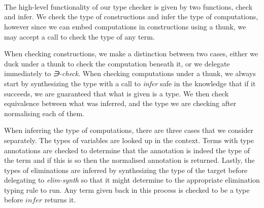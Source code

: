 {\begin{code}
\AgdaSymbol{\{}\AgdaSymbol{\}}\AgdaSpace{}%
\AgdaSymbol{(}\AgdaSpace{}%
\AgdaSpace{}%
\AgdaSymbol{)}\AgdaSpace{}%
\AgdaSymbol{(}\AgdaSpace{}%
\AgdaSpace{}%
\AgdaSymbol{)}\AgdaSpace{}%
\AgdaSymbol{=}%
\>[273I]\<%
\\
\>[273I][@{}l@{\AgdaIndent{0}}]%
\>[35]\AgdaSymbol{\AgdaUnderscore{}}\AgdaSpace{}%
\AgdaSpace{}%
\AgdaSpace{}%
\AgdaSpace{}%
\<%
\\
%
\>[35]\AgdaSpace{}%
\<%
\\
\>[0]\AgdaSpace{}%
\AgdaSpace{}%
%
\>[10]\AgdaSymbol{=}\AgdaSpace{}%
\AgdaSpace{}%
\AgdaSymbol{(}\AgdaSpace{}%
\AgdaOperator{\AgdaFunction{++}}\AgdaSpace{}%
\AgdaSpace{}%
\AgdaSpace{}%
\AgdaOperator{\AgdaFunction{++}}\AgdaSpace{}%
\AgdaSpace{}%
\AgdaOperator{\AgdaFunction{++}}\AgdaSpace{}%
\AgdaSpace{}%
\AgdaSymbol{)}\<%
\end{code}
}

The high-level functionality of our type checker is given by two functions,
check and infer. We check the type of constructions and infer the type of
computations, however since we can embed computations in constructions using
a thunk, we may accept a call to check the type of any term.

When checking constructions, we make a distinction between two cases,
either we duck under a thunk to check the computation beneath it, or we
delegate immediately to \emph{∋-check}. When checking computations under a thunk,
we always start by synthesizing the type with a call to \emph{infer} safe in the
knowledge that if it succeeds, we are guaranteed that what is given is a type.
We then check equivalence between what was inferred, and the type we are checking
after normalising each of them.

When inferring the type of computations, there are three cases that we consider
separately. The types of variables are looked up in the context. Terms with type
annotations are checked to determine that the annotation is indeed the type of
the term and if this is so then the normalised annotation is returned. Lastly,
the types of eliminations are inferred by synthesizing the type of the target
before delegating to \emph{elim-synth} so that it might determine to the appropriate
elimination typing rule to run. Any term given back in this process is checked to
be a type before $infer$ returns it.


